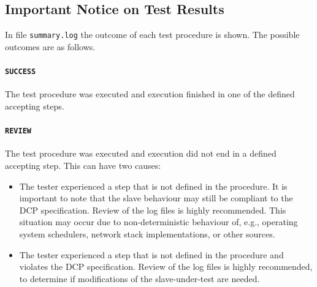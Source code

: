 \documentclass[a4paper]{scrartcl}
\theoremstyle{definition}
\begin{document}
\subsection{Important Notice on Test Results}
\label{sec:test_results}
In file \texttt{summary.log} the outcome of each test procedure is shown.
The possible outcomes are as follows.

\paragraph{\texttt{SUCCESS}} The test procedure was executed and execution finished in one of the defined accepting steps.
\paragraph{\texttt{REVIEW}} The test procedure was executed and execution did not end in a defined accepting step. This can have two causes:

\begin{itemize}
	\item The tester experienced a step that is not defined in the procedure. It is important to note that the slave behaviour may still be compliant to the DCP specification. Review of the log files is highly recommended. This situation may occur due to non-deterministic behaviour of, e.g., operating system schedulers, network stack implementations, or other sources.
	\item The tester experienced a step that is not defined in the procedure and violates the DCP specification. Review of the log files is highly recommended, to determine if modifications of the slave-under-test are needed.
\end{itemize}



\end{document}

